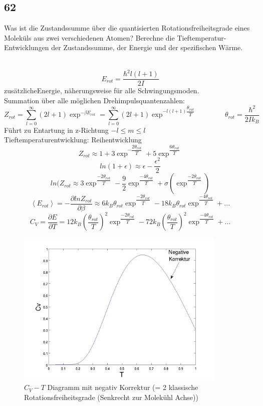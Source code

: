 \documentclass[12pt,a4paper]{report}
\newenvironment{myfrag}{\begin{it}}{\end{it}\vspace{3mm}\par}
\numberwithin{equation}{section}
\begin{document}
\subsection{62}
\begin{myfrag}
Was ist die Zustandssumme über die quantisierten Rotationsfreiheitsgrade
eines Moleküls aus zwei verschiedenen Atomen? Berechne die
Tieftemperatur-Entwicklungen der Zustandssumme, der Energie und der
spezifischen Wärme.
\end{myfrag} \quad \\
$$ E_{rot} = \dfrac{\hbar ^2 l(l+1)}{2I}$$
\glqq zusätzliche\grqq Energie, näherungsweise für alle Schwingungsmoden. \\
Summation über alle möglichen Drehimpulsquantenzahlen:
$$ Z_{rot} = \sum \limits _{l=0}^\infty (2l+1) \exp ^{-\beta E_{rot} } = \sum \limits _{l=0} ^\infty (2l+1) \exp ^{-l(l+1)\dfrac{\theta _{rot}}{T}} \qquad \qquad \theta _{rot} = \dfrac{\hbar ^2}{2Ik_B} $$
Führt zu Entartung in z-Richtung $-l \leqslant m \leqslant l$ \\[1.5ex]
Tieftemperaturentwicklung: Reihentwicklung
$$ Z_{rot} \approx 1 + 3 \exp ^{- \dfrac{2 \theta _{rot}}{T}}+5 \exp ^{\dfrac{6 \theta _{rot}}{T}}$$
$$ ln(1+\epsilon) \approx \epsilon -\dfrac{\epsilon^2}{2}$$
$$ln(Z_{rot} \approx 3 \exp ^{\dfrac{-2 \theta _{rot}}{T}} - \dfrac{9}{2} \exp ^{\dfrac{-4 \theta _{rot}}{T}} + \sigma \left( \exp ^{\dfrac{-2 \theta _{rot}}{T}} \right)$$
$$\left\langle E_{rot} \right\rangle = - \dfrac{\partial lnZ_{rot}}{\partial \beta} \approx 6k_B \theta_{rot} \exp ^{\dfrac{-2 \theta _{rot}}{T}} - 18k_B \theta_{rot}\exp ^{\dfrac{-4 \theta _{rot}}{T}} + ...$$
$$C_V = \dfrac{\partial E}{\partial T} = 12 k_B \left( \dfrac{\theta_{rot}}{T}\right) ^2 \exp ^{\dfrac{-2 \theta _{rot}}{T}} - 72k_B \left( \dfrac{\theta_{rot}}{T}\right) ^2 \exp ^{\dfrac{-4 \theta _{rot}}{T}} + ...$$
\begin{figure}
\begin{center}
\includegraphics[width= 10cm]{Bilder/Frage62.jpg} 
\caption{$C_V-T$ Diagramm mit negativ Korrektur (= 2 klassische Rotationsfreiheitsgrade (Senkrecht zur Molekühl Achse)) }
\end{center}
\end{figure}
\end{document}
